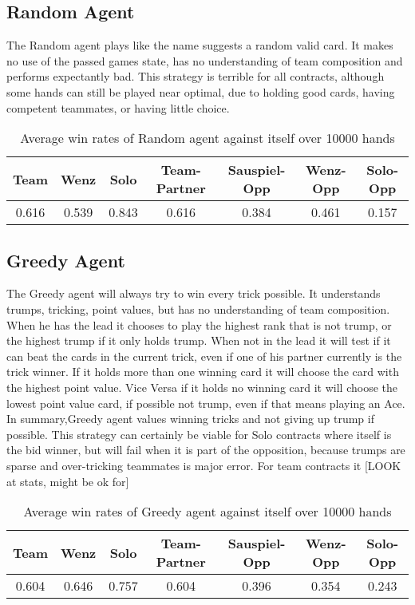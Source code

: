 \subsection{Random Agent}
The Random agent plays like the name suggests a random valid card.
It makes no use of the passed games state, has no understanding of team composition and performs expectantly bad.
This strategy is terrible for all contracts, although some hands can still be played near optimal, due to holding good
cards, having competent teammates, or having little choice.
\begin{table}[!h]
    \centering
    \begin{tabular}{ccccccc}
        \toprule
        Team  & Wenz  & Solo  & Team-Partner & Sauspiel-Opp & Wenz-Opp & Solo-Opp \\
        \midrule
        0.616 & 0.539 & 0.843 & 0.616        & 0.384        & 0.461    & 0.157    \\
        \bottomrule
    \end{tabular}
    \caption{Average win rates of Random agent against itself over 10000 hands}
    \label{tab:winratesRan}
\end{table}

\subsection{Greedy Agent}
The Greedy agent will always try to win every trick possible.
It understands trumps, tricking, point values, but has no understanding of team composition.
When he has the lead it chooses to play the highest rank that is not trump, or the highest trump if it only holds trump.
When not in the lead it will test if it can beat the cards in the current trick, even if one of his partner currently
is the trick winner.
If it holds more than one winning card it will choose the card with the highest point value.
Vice Versa if it holds no winning card it will choose the lowest point value card, if possible not trump, even if
that means playing an Ace.\\
In summary,Greedy agent values winning tricks and not giving up trump if possible.
This strategy can certainly be viable for Solo contracts where itself is the bid winner, but will fail when it is
part of the opposition, because trumps are sparse and over-tricking teammates is major error.
For team contracts it [LOOK at stats, might be ok for]
\begin{table}[!h]
    \centering
    \begin{tabular}{ccccccc}
        \toprule
        Team  & Wenz  & Solo  & Team-Partner & Sauspiel-Opp & Wenz-Opp & Solo-Opp \\
        \midrule
        0.604 & 0.646 & 0.757 & 0.604        & 0.396        & 0.354    & 0.243    \\
        \bottomrule
    \end{tabular}
    \caption{Average win rates of Greedy agent against itself over 10000 hands}
    \label{tab:winratesGre}
\end{table}

